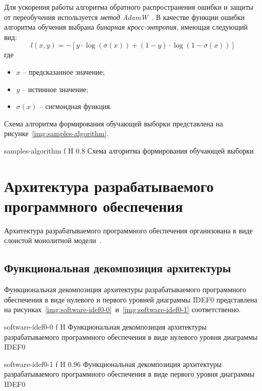 Для ускорения работы алгоритма обратного распространения ошибки и защиты от переобучения используется \textit{метод AdamW}~\cite{adamw}. В качестве функции ошибки алгоритма обучения выбрана \textit{бинарная кросс-энтропия}, имеющая следующий вид:
\begin{equation}
	l(x,y) = -[y \cdot \log(\sigma(x)) + (1 - y) \cdot \log(1 - \sigma(x))]
\end{equation}
где
\begin{itemize}
	\item $x$ -- предсказанное значение;
	\item $y$ -- истинное значение;
	\item $\sigma(x)$ -- сигмоидная функция.
\end{itemize}

Схема алгоритма формирования обучающей выборки представлена на рисунке~\ref{img:samples-algorithm}.

{samples-algorithm}
{f} %
{H}
{0.8\textwidth} %
{Схема алгоритма формирования обучающей выборки}

\section{Архитектура разрабатываемого программного обеспечения}

Архитектура разрабатываемого программного обеспечения организована в виде слоистой монолитной модели~\cite{software-architecture}. 

\subsection{Функциональная декомпозиция архитектуры}

Функциональная декомпозиция архитектуры разрабатываемого программного обеспечения в виде нулевого и первого уровней диаграммы IDEF0 представлена на рисунках~\ref{img:software-idef0-0}~и~\ref{img:software-idef0-1} соответственно.

{software-idef0-0}
{f} %
{H}
{\textwidth} %
{Функциональная декомпозиция архитектуры разрабатываемого программного обеспечения в виде нулевого уровня диаграммы IDEF0}

{software-idef0-1}
{f} %
{H}
{0.96\textwidth} %
{Функциональная декомпозиция архитектуры разрабатываемого программного обеспечения в виде первого уровня диаграммы IDEF0}

